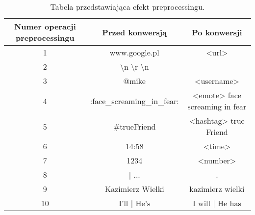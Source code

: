 \begin{table}[!h] \label{tab:tabela2} \centering
    \caption{Tabela przedstawiająca efekt preprocessingu.}
    \begin{tabular} {| c | c | c |} \hline
        Numer operacji preprocessingu & Przed konwersją                                          & Po konwersji                   \\ \hline\hline
        1                             & www.google.pl                                            & <url>                          \\ \hline
        2                             & \textbackslash n \quad \textbackslash r \textbackslash n &                                \\ \hline
        3                             & @mike                                                    & <username>                     \\ \hline
        4                             & :face\_screaming\_in\_fear:                              & <emote> face screaming in fear \\ \hline
        5                             & \#trueFriend                                             & <hashtag> true Friend          \\ \hline
        6                             & 14:58                                                    & <time>                         \\ \hline
        7                             & 1234                                                     & <number>                       \\ \hline
        8                             & | ...                                                    & .                              \\ \hline
        9                             & Kazimierz Wielki                                         & kazimierz wielki               \\ \hline
        10                            & I'll \quad | \quad He's                                  & I will \quad | \quad He has    \\ \hline
    \end{tabular}
\end{table}

%


